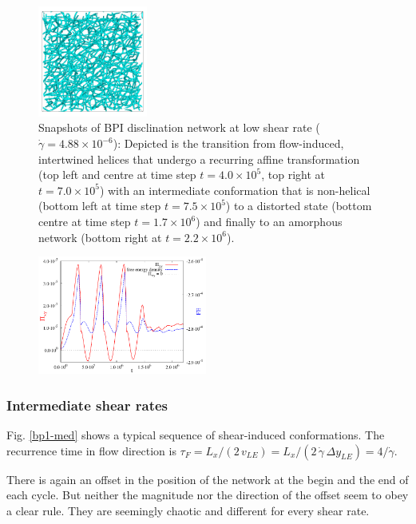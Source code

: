 \documentclass[aps,pre,reprint,superscriptaddress, twocolumn]{revtex4}
\newcommand{\e}[1]{\times10^{#1}}
\newcommand{\gd}{\dot{\gamma}}
\begin{document}
\begin{figure}[ht]
\includegraphics[width=0.32\textwidth]{disc-xy-2200k_run1115.png}
\caption{Snapshots of BPI disclination network at low shear rate ($\dot{\gamma}=4.88\e{-6}$): Depicted is the transition from flow-induced, intertwined helices that undergo a recurring affine transformation (top left and centre at time step $t=4.0\e{5}$, top right at $t=7.0\e{5}$) with an intermediate conformation that is non-helical (bottom left at time step $t=7.5\e{5}$) to a distorted state (bottom centre at time step $t=1.7\e{6}$) and finally to an amorphous network (bottom right at $t=2.2\e{6}$).}
\label{bp1-low}
\end{figure}

\begin{figure}[ht]
\includegraphics[width=0.495\textwidth]{stress_fe_yield_bp1.pdf}
\caption{}
\label{bp1-fe-yield}
\end{figure}




\subsubsection{Intermediate shear rates}

Fig. \ref{bp1-med} shows a typical sequence of shear-induced conformations.
The recurrence time in flow direction is $\tau_F=L_x/(2\, v_{LE})=L_x/(2\,\gd\, \Delta y_{LE})= 4/\gd$.


There is again an offset in the position of the network at the begin and the end of each cycle. 
But neither the magnitude nor the direction of the offset seem to obey a clear rule.
They are seemingly chaotic and different for every shear rate. 
\end{document}
